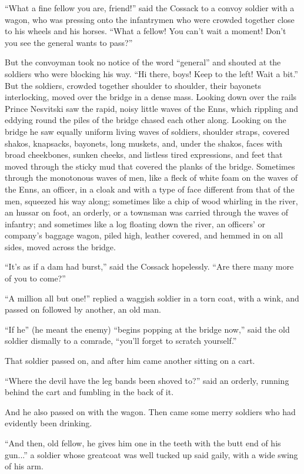 ``What a fine fellow you are, friend!'' said the Cossack to a
convoy soldier with a wagon, who was pressing onto the
infantrymen who were crowded together close to his wheels and his
horses. ``What a fellow! You can't wait a moment! Don't you see
the general wants to pass?''

But the convoyman took no notice of the word ``general'' and
shouted at the soldiers who were blocking his way. ``Hi there,
boys! Keep to the left! Wait a bit.'' But the soldiers, crowded
together shoulder to shoulder, their bayonets interlocking, moved
over the bridge in a dense mass. Looking down over the rails
Prince Nesvitski saw the rapid, noisy little waves of the Enns,
which rippling and eddying round the piles of the bridge chased
each other along. Looking on the bridge he saw equally uniform
living waves of soldiers, shoulder straps, covered shakos,
knapsacks, bayonets, long muskets, and, under the shakos, faces
with broad cheekbones, sunken cheeks, and listless tired
expressions, and feet that moved through the sticky mud that
covered the planks of the bridge. Sometimes through the
monotonous waves of men, like a fleck of white foam on the waves
of the Enns, an officer, in a cloak and with a type of face
different from that of the men, squeezed his way along; sometimes
like a chip of wood whirling in the river, an hussar on foot, an
orderly, or a townsman was carried through the waves of infantry;
and sometimes like a log floating down the river, an officers' or
company's baggage wagon, piled high, leather covered, and hemmed
in on all sides, moved across the bridge.

``It's as if a dam had burst,'' said the Cossack
hopelessly. ``Are there many more of you to come?''

``A million all but one!'' replied a waggish soldier in a torn
coat, with a wink, and passed on followed by another, an old man.

``If he'' (he meant the enemy) ``begins popping at the bridge
now,'' said the old soldier dismally to a comrade, ``you'll
forget to scratch yourself.''

That soldier passed on, and after him came another sitting on a
cart.

``Where the devil have the leg bands been shoved to?'' said an
orderly, running behind the cart and fumbling in the back of it.

And he also passed on with the wagon. Then came some merry
soldiers who had evidently been drinking.

``And then, old fellow, he gives him one in the teeth with the
butt end of his gun...'' a soldier whose greatcoat was well
tucked up said gaily, with a wide swing of his arm.

